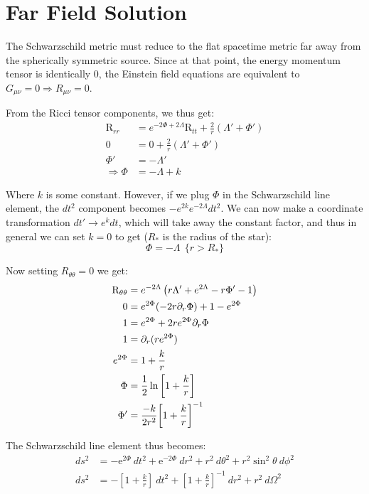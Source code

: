 \documentclass[12pt, letterpaper]{report}
\begin{document}
\section{Far Field Solution}

The Schwarzschild metric must reduce to the flat spacetime metric far away from the spherically symmetric source. Since at that point, the energy momentum tensor is identically 0, the Einstein field equations are equivalent to $G_{\mu\nu}= 0 \Rightarrow R_{\mu\nu}= 0$.

From the Ricci tensor components, we thus get: 
\begin{align*}
    \text{R}_{rr}&= e^{-2 \Phi+2 \Lambda}\text{R}_{tt}+ \frac{2}{r}\left(\Lambda'+ \Phi '\right)\\
    0 &= 0+ \frac{2}{r}\left(\Lambda'+ \Phi '\right)\\
    \Phi' &= -\Lambda'\\
    \Rightarrow \Phi &= -\Lambda + k
\end{align*}

Where $k$ is some constant. However, if we plug $\Phi$ in the Schwarzschild line element, the $dt^2$ component becomes $-e^{2k}e^{-2\Lambda}dt^2$. We can now make a coordinate transformation $dt' \rightarrow e^k dt$, which will take away the constant factor, and thus in general we can set $k=0$ to get ($R_*$ is the radius of the star): $$\Phi= -\Lambda\ \ \{r>R_*\}$$

Now setting $R_{\theta \theta }= 0$ we get: 
\begin{align*}
    \text{R}_{\theta \theta }&=e^{-2 \Lambda } \left(r \Lambda '+e^{2 \Lambda }-r \Phi '-1\right)\\
    0 &= e^{2\Phi}(-2r\partial_r\Phi) + 1-e^{2\Phi}\\
    1 &= e^{2\Phi}+2re^{2\Phi}\partial_r\Phi\\
    1 &= \partial_r(re^{2\Phi})\\
    e^{2\Phi} &= 1+\frac{k}{r}\\
    \Phi &= \frac{1}{2}\ln\left[{1+\frac{k}{r}}\right]\\
    \Phi' &= \frac{-k}{2r^2}\qty[1+\frac{k}{r}]^{-1}
\end{align*}

The Schwarzschild line element thus becomes: 
\begin{align*}
    ds^2 &= -\mathrm{e}^{2\Phi}\ dt^2+ \mathrm{e}^{-2\Phi}\ dr^2+r^2\ d\theta^2+r^2\sin^2\theta\ d\phi^2\\
    ds^2 &= -\left[1+\frac{k}{r}\right]\ dt^2+ \left[1+\frac{k}{r}\right]^{-1}\ dr^2+r^2\ d\Omega^2
\end{align*}
\end{document}
